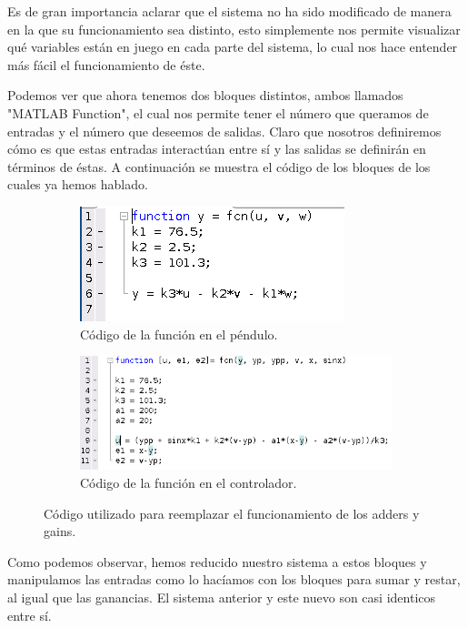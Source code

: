 \documentclass[12pt, letterpaper]{article}
\begin{document}
Es de gran importancia aclarar que el sistema no ha sido modificado de manera en la que su funcionamiento sea distinto, esto simplemente nos permite visualizar qué variables están en juego en cada parte del sistema, lo cual nos hace entender más fácil el funcionamiento de éste.

Podemos ver que ahora tenemos dos bloques distintos, ambos llamados "MATLAB Function", el cual nos permite tener el número que queramos de entradas y el número que deseemos de salidas. Claro que nosotros definiremos cómo es que estas entradas interactúan entre sí y las salidas se definirán en términos de éstas. A continuación se muestra el código de los bloques de los cuales ya hemos hablado.

\begin{figure}[H]
	\centering
	\begin{subfigure}[b]{0.55\linewidth}
		\includegraphics[width=\linewidth]{m1.png}
		\caption{Código de la función en el péndulo.}
	\end{subfigure}

	\begin{subfigure}[b]{0.75\linewidth}
		\includegraphics[width=\linewidth]{m2.png}
		\caption{Código de la función en el controlador.}
	\end{subfigure}
	\caption{Código utilizado para reemplazar el funcionamiento de los adders y gains.}
\end{figure}

Como podemos observar, hemos reducido nuestro sistema a estos bloques y manipulamos las entradas como lo hacíamos con los bloques para sumar y restar, al igual que las ganancias. El sistema anterior y este nuevo son casi identicos entre sí.
\end{document}
